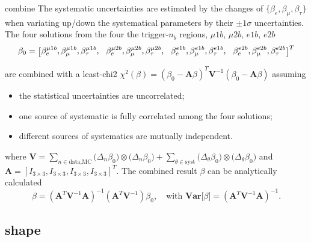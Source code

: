 \begin{frame}{combine}
\smaller
    The systematic uncertainties are estimated by the changes of $\{\beta_{e},\beta_{\mu},\beta_{\tau}\}$ when variating up/down the systematical parameters by their $\pm 1\sigma$ uncertainties.
    The four solutions from the four the trigger-$n_b$ regions, $\mu 1b$, $\mu 2b$, $e1b$, $e2b$
    \begin{equation*}
        \tiny
        \beta_0 = \bigg [
        \beta_e^{\mu1b}, \beta_\mu^{\mu1b}, \beta_\tau^{\mu1b}, \quad 
        \beta_e^{\mu2b}, \beta_\mu^{\mu2b}, \beta_\tau^{\mu2b}, \quad 
        \beta_e^{e1b}, \beta_\mu^{e1b}, \beta_\tau^{e1b}, \quad
        \beta_e^{e2b}, \beta_\mu^{e2b}, \beta_\tau^{e2b}
        \bigg ]^T
    \end{equation*}
    
    are combined with a least-chi2 $\chi^2(\beta) = (\beta_0 - \textbf{A} \beta )^T \textbf{V}^{-1} (\beta_0 - \textbf{A} \beta ) $ assuming
    \begin{itemize}
        \item the statistical uncertainties are uncorrelated;
        \item one source of systematic is fully correlated among the four solutions;
        \item different sources of systematics are mutually independent.
    \end{itemize}

    where 
    $\textbf{V} =
    \sum_{n \in \text{data,MC}} \big( \Delta_{n}\beta_0 \big) \otimes   \big( \Delta_{n}\beta_0 \big) +
    \sum_{\theta \in \text{syst}} \big( \Delta_{\theta}\beta_0 \big) \otimes  \big( \Delta_{\theta}\beta_0 \big)
    $
    and $\textbf{A}=[I_{3\times3}, I_{3\times3}, I_{3\times3}, I_{3\times3}]^T$. The combined result $\beta$ can be analytically calculated 
    \begin{equation*}
        \beta =   (\textbf{A}^T \textbf{V}^{-1} \textbf{A})^{-1}(\textbf{A}^T \textbf{V}^{-1}) \beta_0, \quad
        \text{with } \textbf{Var}\big[\beta\big]  =   (\textbf{A}^T \textbf{V}^{-1} \textbf{A})^{-1} .
    \end{equation*}

\end{frame}



\subsection{shape}

